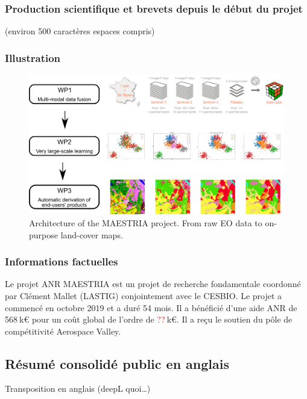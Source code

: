 \subsubsection*{Production scientifique et brevets depuis le début du projet}(environ 500 caractères espaces compris) \\


\subsubsection*{Illustration}
\begin{figure}[h]
    \centering
    \includegraphics[width=0.9\columnwidth]{img/wp_maestria.png}
    \caption{Architecture of the MAESTRIA project. From raw EO data to on-purpose land-cover maps.}
    \label{fig:enter-label}
\end{figure}



\subsubsection*{Informations factuelles}

Le projet ANR MAESTRIA est un projet de recherche fondamentale coordonné par Clément Mallet (LASTIG) conjointement avec le CESBIO. Le projet a commencé en octobre 2019 et a duré 54 mois. Il a bénéficié d’une aide ANR de 568$\:$k€ pour un coût global de l’ordre de \textcolor{red}{??}$\:$k€. Il a reçu le soutien du pôle de compétitivité Aerospace Valley.


\subsection{Résumé consolidé public en anglais}

Transposition en anglais (deepL quoi\ldots)